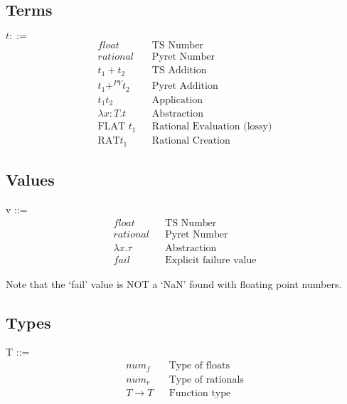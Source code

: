 \documentclass{article}
\begin{document}
	\subsection{Terms}
	$t ::=$
	\begin{align*}
		float 		  								&& \text{TS Number} \\
		rational	  								&& \text{Pyret Number} \\
		t_1 + t_2 									&& \text{TS Addition} \\
		t_1 +^{PY} t_2 								&& \text{Pyret Addition} \\
		t_1 t_2 							    	&& \text{Application} \\
		\lambda x\colon T. t					    && \text{Abstraction} \\
		\text{FLAT } t_1							&& \text{Rational Evaluation (lossy)}\\
		\text{RAT} t_1								&& \text{Rational Creation}
	\end{align*}


	\subsection{Values}
	v ::=
	\begin{align*}
		float						&& \text{TS Number} \\
		rational					&& \text{Pyret Number}\\
		\lambda x. \tau		    	&& \text{Abstraction} \\
		fail						&& \text{Explicit failure value}
	\end{align*}

	Note that the `fail' value is NOT a `NaN' found with floating point numbers.

	\subsection{Types}
	T ::=
	\begin{align*}
		num_f				&& \text{Type of floats}\\
		num_r				&& \text{Type of rationals}\\
		T \rightarrow T		&& \text{Function type}
	\end{align*}
	
	
\end{document}
